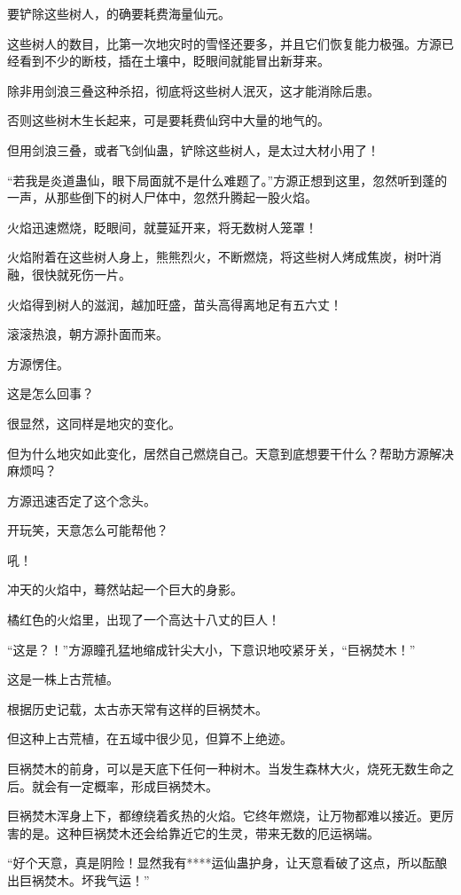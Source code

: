 
\begin{this_body}

要铲除这些树人，的确要耗费海量仙元。

这些树人的数目，比第一次地灾时的雪怪还要多，并且它们恢复能力极强。方源已经看到不少的断枝，插在土壤中，眨眼间就能冒出新芽来。

除非用剑浪三叠这种杀招，彻底将这些树人泯灭，这才能消除后患。

否则这些树木生长起来，可是要耗费仙窍中大量的地气的。

但用剑浪三叠，或者飞剑仙蛊，铲除这些树人，是太过大材小用了！

“若我是炎道蛊仙，眼下局面就不是什么难题了。”方源正想到这里，忽然听到蓬的一声，从那些倒下的树人尸体中，忽然升腾起一股火焰。

火焰迅速燃烧，眨眼间，就蔓延开来，将无数树人笼罩！

火焰附着在这些树人身上，熊熊烈火，不断燃烧，将这些树人烤成焦炭，树叶消融，很快就死伤一片。

火焰得到树人的滋润，越加旺盛，苗头高得离地足有五六丈！

滚滚热浪，朝方源扑面而来。

方源愣住。

这是怎么回事？

很显然，这同样是地灾的变化。

但为什么地灾如此变化，居然自己燃烧自己。天意到底想要干什么？帮助方源解决麻烦吗？

方源迅速否定了这个念头。

开玩笑，天意怎么可能帮他？

吼！

冲天的火焰中，蓦然站起一个巨大的身影。

橘红色的火焰里，出现了一个高达十八丈的巨人！

“这是？！”方源瞳孔猛地缩成针尖大小，下意识地咬紧牙关，“巨祸焚木！”

这是一株上古荒植。

根据历史记载，太古赤天常有这样的巨祸焚木。

但这种上古荒植，在五域中很少见，但算不上绝迹。

巨祸焚木的前身，可以是天底下任何一种树木。当发生森林大火，烧死无数生命之后。就会有一定概率，形成巨祸焚木。

巨祸焚木浑身上下，都缭绕着炙热的火焰。它终年燃烧，让万物都难以接近。更厉害的是。这种巨祸焚木还会给靠近它的生灵，带来无数的厄运祸端。

“好个天意，真是阴险！显然我有****运仙蛊护身，让天意看破了这点，所以酝酿出巨祸焚木。坏我气运！”


\end{this_body}
